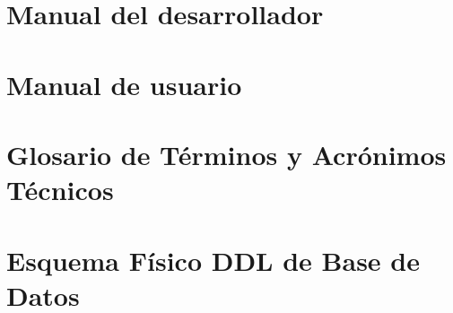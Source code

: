 \appendix

\chapter{Manual del desarrollador}

\newpage{\ }
\cleardoublepage

\chapter{Manual de usuario}

\newpage{\ }
\cleardoublepage

\chapter{Glosario de Términos y Acrónimos Técnicos}

\newpage{\ }
\cleardoublepage

\chapter{Esquema Físico DDL de Base de Datos}
